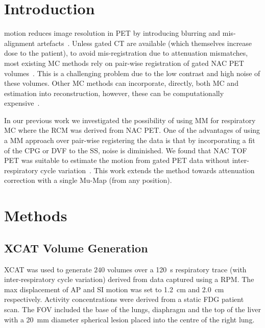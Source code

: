 \section{Introduction} \label{sec:introduction}
     motion reduces image resolution in \gls{PET} by introducing blurring and mis-alignment artefacts~\cite{Nehmeh2008a}. Unless gated \gls{CT} are available (which themselves increase dose to the patient), to avoid mis-registration due to attenuation mismatches, most existing \gls{MC} methods rely on pair-wise registration of gated \gls{NAC} \gls{PET} volumes~\cite{LungMotionDiaphragmBaiBib}.%
    This is a challenging problem due to the low contrast and high noise of these volumes. Other \gls{MC} methods can incorporate, directly, both \gls{MC} and  estimation into reconstruction, however, these can be computationally expensive~\cite{Bousse2016b}.
    
    In our previous work we investigated the possibility of using \gls{MM} for respiratory \gls{MC} where the \gls{RCM} was derived from \gls{NAC} \gls{PET}. One of the advantages of using a \gls{MM} approach over pair-wise registering the data is that by incorporating a fit of the \gls{CPG} or \gls{DVF} to the \gls{SS}, noise is diminished. We found that \gls{NAC} \gls{TOF} \gls{PET} was suitable to estimate the motion from gated PET data without inter-respiratory cycle variation~\cite{Whitehead2019ImpactPET}. This work extends the method towards attenuation correction with a single \gls{Mu-Map} (from any position).

\vspace{-0.5cm}

\section{Methods} \label{sec:methods}
    \subsection{XCAT Volume Generation} \label{sec:xcat_volume_generation}
        \gls{XCAT}%
        was used to generate $240$ volumes over a \SI{120}{\second} respiratory trace (with inter-respiratory cycle variation) derived from data captured using a \gls{RPM}. The max displacement of \gls{AP} and \gls{SI} motion was set to \SI{1.2}{\centi\metre} and \SI{2.0}{\centi\metre} respectively. Activity concentrations were derived from a static \gls{FDG} patient scan. The \gls{FOV} included the base of the lungs, diaphragm and the top of the liver with a \SI{20}{\milli\metre} diameter spherical lesion placed into the centre of the right lung.
    
